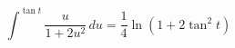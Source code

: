 \begin{displaymath}
 \int^{\tan t}\frac{u}{1+2u^2}\,du = \frac{1}{4}\ln(1+2\tan^2t)
\end{displaymath}
